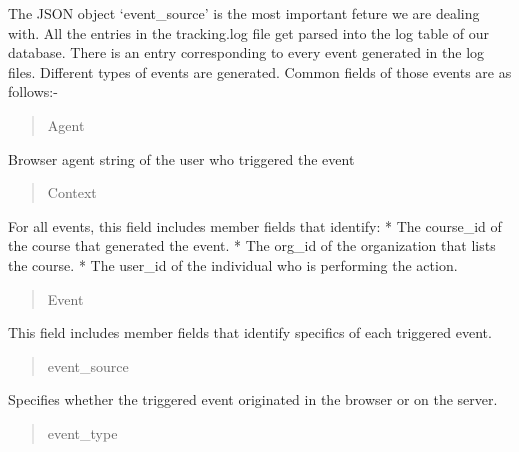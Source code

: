 \documentclass[a4paper,12pt,oneside]{sphinxmanual}
\begin{document}
The JSON object `event\_source' is the most important feture we are dealing with. All the entries in the tracking.log file get parsed into the log table of our database. There is an entry corresponding to every event generated in the log files. Different types of events are generated. Common fields of those events are as follows:-
\begin{quote}\begin{description}
\item[{Agent}] \leavevmode
\end{description}\end{quote}

\begin{DUlineblock}{0em}
\item[] Browser agent string of the user who triggered the event
\end{DUlineblock}
\begin{quote}\begin{description}
\item[{Context}] \leavevmode
\end{description}\end{quote}

\begin{DUlineblock}{0em}
\item[] For all events, this field includes member fields that identify:
* The course\_id of the course that generated the event.
* The org\_id of the organization that lists the course.
* The user\_id of the individual who is performing the action.
\end{DUlineblock}
\begin{quote}\begin{description}
\item[{Event}] \leavevmode
\end{description}\end{quote}

\begin{DUlineblock}{0em}
\item[] This field includes member fields that identify specifics of each triggered event.
\end{DUlineblock}
\begin{quote}\begin{description}
\item[{event\_source}] \leavevmode
\end{description}\end{quote}

\begin{DUlineblock}{0em}
\item[] Specifies whether the triggered event originated in the browser or on the server.
\end{DUlineblock}
\begin{quote}\begin{description}
\item[{event\_type}] \leavevmode
\end{description}\end{quote}
\end{document}
